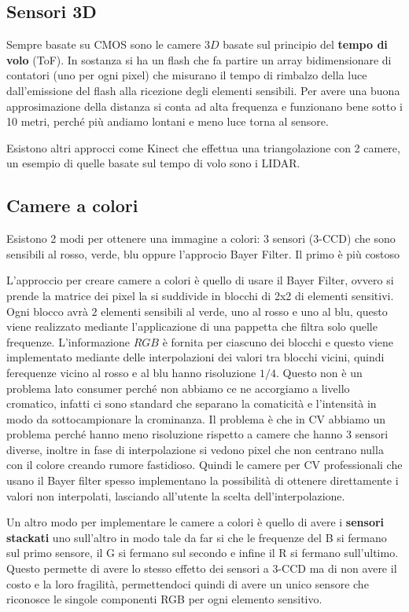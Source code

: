 \subsection{Sensori 3D}
Sempre basate su CMOS sono le camere $3D$ basate sul principio del \textbf{tempo di volo} (ToF). 
In sostanza si ha un flash che fa partire 
un array bidimensionare di contatori (uno per ogni pixel) che misurano il tempo 
di rimbalzo della luce dall'emissione del flash alla ricezione degli elementi 
sensibili. Per avere una buona approsimazione della distanza si conta ad alta frequenza
e funzionano bene sotto i 10 metri, perché più andiamo lontani e meno luce torna 
al sensore.

Esistono altri approcci come Kinect che effettua una triangolazione con 2 camere,
un esempio di quelle basate sul tempo di volo sono i LIDAR.

\subsection{Camere a colori}
Esistono 2 modi per ottenere una immagine a colori: 3 sensori (3-CCD) che sono sensibili 
al rosso, verde, blu oppure l'approcio Bayer Filter. Il primo è più costoso

L'approccio per creare camere a colori è quello di usare il Bayer Filter, ovvero 
si prende la matrice dei pixel la si suddivide in blocchi di 2x2 di elementi sensitivi.
Ogni blocco avrà $2$ elementi sensibili al verde, uno al rosso e uno al blu, questo 
viene realizzato mediante l'applicazione di una pappetta che filtra solo quelle frequenze.
L'informazione $RGB$ è fornita per ciascuno dei blocchi e questo viene implementato 
mediante delle interpolazioni dei valori tra blocchi vicini, quindi ferequenze vicino 
al rosso e al blu hanno risoluzione $1/4$. Questo non è un problema lato consumer
perché non abbiamo ce ne accorgiamo a livello cromatico, infatti ci sono standard
che separano la comaticità e l'intensità in modo da sottocampionare la crominanza.
Il problema è che in CV abbiamo un problema perché hanno meno risoluzione rispetto 
a camere che hanno 3 sensori diverse, inoltre in fase di interpolazione si vedono 
pixel che non centrano nulla con il colore creando rumore fastidioso. Quindi le camere per CV professionali 
che usano il Bayer filter spesso implementano la possibilità di ottenere direttamente 
i valori non interpolati, lasciando all'utente la scelta dell'interpolazione. 

Un altro modo per implementare le camere a colori è quello di avere i \textbf{sensori stackati} 
uno sull'altro in modo tale da far si che le frequenze del B si fermano sul primo 
sensore, il G si fermano sul secondo e infine il R si fermano sull'ultimo. Questo 
permette di avere lo stesso effetto dei sensori a 3-CCD ma di non avere il costo 
e la loro fragilità, permettendoci quindi di avere un unico sensore che riconosce
le singole componenti RGB per ogni elemento sensitivo.

